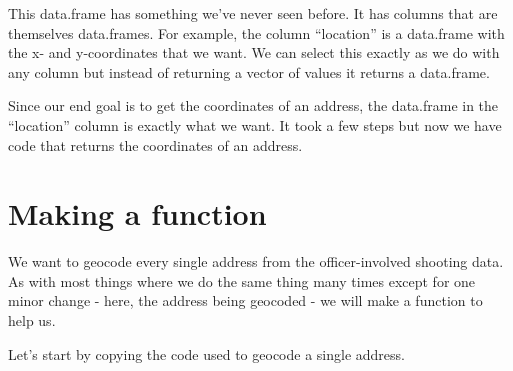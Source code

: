 \documentclass[
  12pt,
]{book}
\newenvironment{Shaded}{\begin{snugshade}}{\end{snugshade}}
\newcommand{\CommentTok}[1]{\textcolor[rgb]{0.37,0.37,0.37}{\textit{#1}}}
\newcommand{\DecValTok}[1]{\textcolor[rgb]{0.06,0.06,0.06}{#1}}
\newcommand{\KeywordTok}[1]{\textcolor[rgb]{0.27,0.27,0.27}{\textbf{#1}}}
\newcommand{\NormalTok}[1]{#1}
\newcommand{\OperatorTok}[1]{\textcolor[rgb]{0.43,0.43,0.43}{\textbf{#1}}}
\newcommand{\StringTok}[1]{\textcolor[rgb]{0.5,0.5,0.5}{#1}}
\begin{document}
This data.frame has something we've never seen before. It has columns that are themselves data.frames. For example, the column ``location'' is a data.frame with the x- and y-coordinates that we want. We can select this exactly as we do with any column but instead of returning a vector of values it returns a data.frame.

\begin{Shaded}
\end{Shaded}

Since our end goal is to get the coordinates of an address, the data.frame in the ``location'' column is exactly what we want. It took a few steps but now we have code that returns the coordinates of an address.

\hypertarget{making-a-function-1}{%
\section{Making a function}\label{making-a-function-1}}

We want to geocode every single address from the officer-involved shooting data. As with most things where we do the same thing many times except for one minor change - here, the address being geocoded - we will make a function to help us.

Let's start by copying the code used to geocode a single address.

\begin{Shaded}
\end{Shaded}
\end{document}
